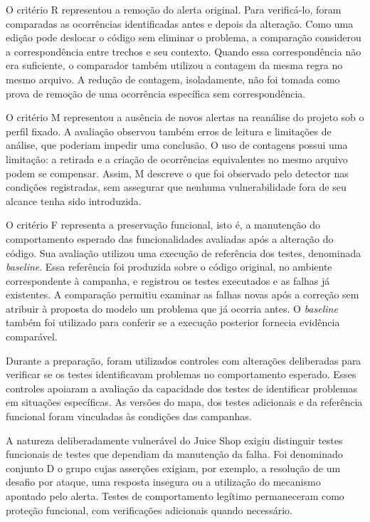 O critério R representou a remoção do alerta original. Para verificá-lo, foram comparadas as ocorrências identificadas antes e depois da alteração. Como uma edição pode deslocar o código sem eliminar o problema, a comparação considerou a correspondência entre trechos e seu contexto. Quando essa correspondência não era suficiente, o comparador também utilizou a contagem da mesma regra no mesmo arquivo. A redução de contagem, isoladamente, não foi tomada como prova de remoção de uma ocorrência específica sem correspondência.

O critério M representou a ausência de novos alertas na reanálise do projeto sob o perfil fixado. A avaliação observou também erros de leitura e limitações de análise, que poderiam impedir uma conclusão. O uso de contagens possui uma limitação: a retirada e a criação de ocorrências equivalentes no mesmo arquivo podem se compensar. Assim, M descreve o que foi observado pelo detector nas condições registradas, sem assegurar que nenhuma vulnerabilidade fora de seu alcance tenha sido introduzida.

O critério F representa a preservação funcional, isto é, a manutenção do comportamento esperado das funcionalidades avaliadas após a alteração do código. Sua avaliação utilizou uma execução de referência dos testes, denominada \textit{baseline}. Essa referência foi produzida sobre o código original, no ambiente correspondente à campanha, e registrou os testes executados e as falhas já existentes. A comparação permitiu examinar as falhas novas após a correção sem atribuir à proposta do modelo um problema que já ocorria antes. O \textit{baseline} também foi utilizado para conferir se a execução posterior fornecia evidência comparável.

Durante a preparação, foram utilizados controles com alterações deliberadas para verificar se os testes identificavam problemas no comportamento esperado. Esses controles apoiaram a avaliação da capacidade dos testes de identificar problemas em situações específicas. As versões do mapa, dos testes adicionais e da referência funcional foram vinculadas às condições das campanhas.

A natureza deliberadamente vulnerável do Juice Shop exigiu distinguir testes funcionais de testes que dependiam da manutenção da falha. Foi denominado conjunto D o grupo cujas asserções exigiam, por exemplo, a resolução de um desafio por ataque, uma resposta insegura ou a utilização do mecanismo apontado pelo alerta. Testes de comportamento legítimo permaneceram como proteção funcional, com verificações adicionais quando necessário.

